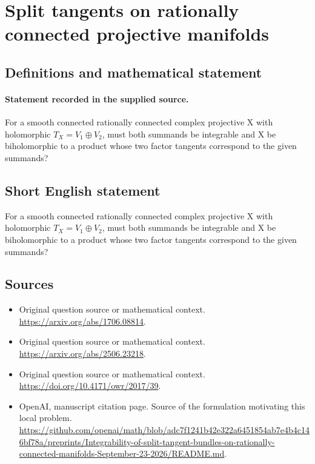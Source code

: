 \documentclass[11pt]{article}
\begin{document}
\section*{Split tangents on rationally connected projective manifolds}\label{statement}
\subsection{Definitions and mathematical statement}
\paragraph{Statement recorded in the supplied source.}
For a smooth connected rationally connected complex projective X with holomorphic $T_X=V_{1}\oplus V_{2}$, must both summands be integrable and X be biholomorphic to a product whose two factor tangents correspond to the given summands?
\subsection{Short English statement}
For a smooth connected rationally connected complex projective X with holomorphic $T_X=V_{1}\oplus V_{2}$, must both summands be integrable and X be biholomorphic to a product whose two factor tangents correspond to the given summands?
\subsection{Sources}
\begin{itemize}
\item[S1] Original question source or mathematical context.
\url{https://arxiv.org/abs/1706.08814}.
\item[S2] Original question source or mathematical context.
\url{https://arxiv.org/abs/2506.23218}.
\item[S3] Original question source or mathematical context.
\url{https://doi.org/10.4171/owr/2017/39}.
\item[S4] OpenAI, manuscript citation page. Source of the formulation motivating this local problem.
\url{https://github.com/openai/math/blob/adc7f1241b42e322a6451854ab7e4b4c146bf78a/preprints/Integrability-of-split-tangent-bundles-on-rationally-connected-manifolds-September-23-2026/README.md}.
\end{itemize}
\end{document}
